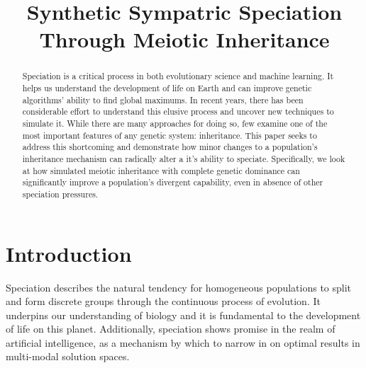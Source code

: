 \documentclass[conference]{IEEEtran}
\begin{document}
\title{Synthetic Sympatric Speciation\\ Through Meiotic Inheritance}

\author{
\and
{}
}

\maketitle
\begin{abstract}
Speciation is a critical process in both evolutionary science and machine learning. It helps us understand the development of life on Earth and can improve genetic algorithms' ability to find global maximums. In recent years, there has been considerable effort to understand this elusive process and uncover new techniques to simulate it. While there are many approaches for doing so, few examine one of the most important features of any genetic system: inheritance. This paper seeks to address this shortcoming and demonstrate how minor changes to a population's inheritance mechanism can radically alter a it's ability to speciate. Specifically, we look at how simulated meiotic inheritance with complete genetic dominance can significantly improve a population's divergent capability, even in absence of other speciation pressures. 
\end{abstract}

\section{Introduction}

Speciation describes the natural tendency for homogeneous populations to split and form discrete groups through the continuous process of evolution. \cite{SPBOOK} It underpins our understanding of biology and it is fundamental to the development of life on this planet. Additionally, speciation shows promise in the realm of artificial intelligence, as a mechanism by which to narrow in on optimal results in multi-modal solution spaces.
\end{document}
